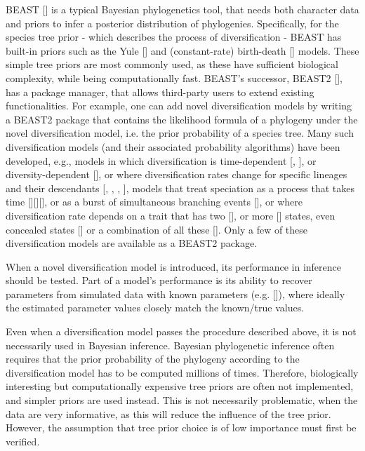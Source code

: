 BEAST [\cite{drummond2007beast}] is a typical Bayesian phylogenetics tool, 
that needs both character data and priors to infer 
a posterior distribution of phylogenies.
Specifically, for the species tree prior - which describes 
the process of diversification - 
BEAST has built-in priors such as the Yule [\cite{yule}] and 
(constant-rate) birth-death [\cite{nee1994reconstructed}] models.
These simple tree priors are most commonly used, as these 
have sufficient biological complexity, while being computationally fast.
BEAST's successor, BEAST2 [\cite{bouckaert2019beast}],
has a package manager, that allows third-party users 
to extend existing functionalities. For example, 
one can add novel diversification models by writing a BEAST2 package 
that contains the likelihood formula of a phylogeny 
under the novel diversification model, 
i.e. the prior probability of a species tree.
Many such diversification models (and their associated probability algorithms) 
have been developed, e.g., models in which diversification is 
time-dependent [\cite{nee1994reconstructed}, \cite{rabosky2008explosive}], 
or diversity-dependent [\cite{etienne2011diversity}],
or where diversification rates change for specific lineages 
and their descendants [\cite{etienne2012conceptual}, 
\cite{rabosky2014automatic}, \cite{alfaro2009nine}, 
\cite{laudanno2018sls}], models that treat speciation as a process that takes 
time [\cite{rosindell2010protracted}][\cite{etienne2012prolonging}][\cite{lambert2015reconstructed}], 
or as a burst of simultaneous branching
events [\cite{laudanno2018mbd}], or where diversification rate
depends on a trait that has two [\cite{maddison2007estimating}], 
or more [\cite{fitzjohn2012diversitree}] states,
even concealed states [\cite{beaulieu2016detecting}] 
or a combination of all these [\cite{herrera2018detecting}].
Only a few of these diversification models are available as a BEAST2 package.

When a novel diversification model is introduced,
its performance in inference should be tested.
Part of a model's performance is its ability to recover parameters 
from simulated data with known 
parameters (e.g. [\cite{etienne2014estimating}]), 
where ideally the estimated parameter values closely match 
the known/true values.

Even when a diversification model passes the procedure described above,
it is not necessarily used in Bayesian inference.
Bayesian phylogenetic inference often requires 
that the prior probability of the phylogeny 
according to the diversification model has to be computed millions of times. 
Therefore, biologically interesting but computationally expensive tree priors 
are often not implemented, and simpler priors are used instead. 
This is not necessarily problematic, when the data are very informative, 
as this will reduce the influence of the tree prior.
However, the assumption that tree prior choice is of low importance 
must first be verified.

